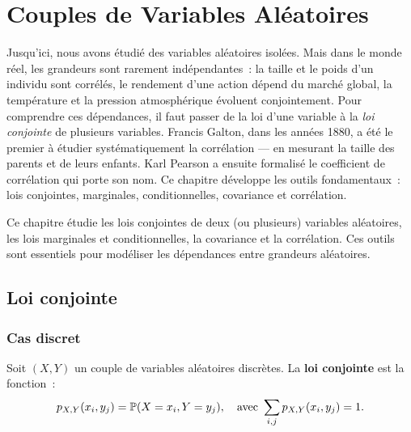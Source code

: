 \chapter{Couples de Variables Al\'eatoires}
\label{ch:couples}

Jusqu'ici, nous avons \'etudi\'e des variables al\'eatoires isol\'ees. Mais dans le monde r\'eel, les grandeurs sont rarement ind\'ependantes~: la taille et le poids d'un individu sont corr\'el\'es, le rendement d'une action d\'epend du march\'e global, la temp\'erature et la pression atmosph\'erique \'evoluent conjointement. Pour comprendre ces d\'ependances, il faut passer de la loi d'une variable \`a la \emph{loi conjointe} de plusieurs variables. Francis Galton, dans les ann\'ees 1880, a \'et\'e le premier \`a \'etudier syst\'ematiquement la corr\'elation --- en mesurant la taille des parents et de leurs enfants. Karl Pearson a ensuite formalis\'e le coefficient de corr\'elation qui porte son nom. Ce chapitre d\'eveloppe les outils fondamentaux~: lois conjointes, marginales, conditionnelles, covariance et corr\'elation.

\begin{intuition}
Ce chapitre \'etudie les lois conjointes de deux (ou plusieurs) variables al\'eatoires,
les lois marginales et conditionnelles, la covariance et la corr\'elation. Ces outils
sont essentiels pour mod\'eliser les d\'ependances entre grandeurs al\'eatoires.
\end{intuition}

\section{Loi conjointe}

\subsection{Cas discret}

\begin{definition}
Soit $(X, Y)$ un couple de variables al\'eatoires discr\`etes. La \textbf{loi
conjointe} est la fonction~:
\[
    p_{X,Y}(x_i, y_j) = \mathbb{P}(X = x_i, Y = y_j), \quad
    \text{avec } \sum_{i,j} p_{X,Y}(x_i, y_j) = 1.
\]
\end{definition}

